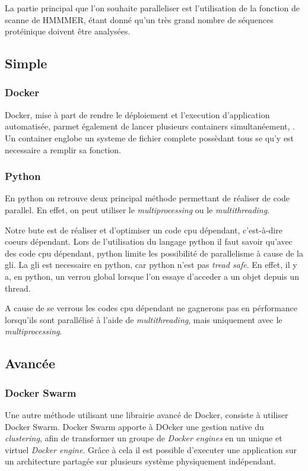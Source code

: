 La partie principal que l'on souhaite paralleliser est l'utilisation de la fonction de scanne de HMMMER, étant donné qu'un très grand nombre de séquences protéinique doivent être analysées.

\subsection{Simple}
\subsubsection{Docker}
Docker, mise à part de rendre le déploiement et l'execution d'application automatisée, parmet également de lancer plusieurs containers simultanéement, . Un container englobe un systeme de fichier complete possèdant tous se qu'y est necessaire a remplir sa fonction. 

\subsubsection{Python}
En python on retrouve deux principal méthode permettant de réaliser de code parallel. En effet, on peut utiliser le \emph{multiprocessing} ou le \emph{multithreading}.

Notre bute est de réaliser et d'optimiser un code \gls{cpu} dépendant, c'est-à-dire coeurs dépendant. Lors de l'utilisation du langage python il faut savoir qu'avec des code \gls{cpu} dépendant, python limite les possibilité de parallelisme à cause de la \gls{gli}. La \gls{gli} est necessaire en python, car python n'est pas \emph{tread safe}. En effet, il y a, en python, un verrou global lorsque l'on essaye d'acceder a un objet depuis un thread.

A cause de se verrous les codes \gls{cpu} dépendant ne gagnerons pas en pérformance lorsqu'ils sont parallélisé à l'aide de \emph{multithreading}, mais uniquement avec le \emph{multiprocessing}.

\subsection{Avancée}
\subsubsection{Docker Swarm}
Une autre méthode utilisant une librairie avancé de Docker, consiste à utiliser Docker Swarm. Docker Swarm apporte à DOcker une gestion native du \emph{clustering}, afin de transformer un groupe de \emph{Docker engines} en un unique et virtuel \emph{Docker engine}. Grâce à cela il est possible d'executer une application sur un architecture partagée sur plusieurs système physiquement indépendant. 

